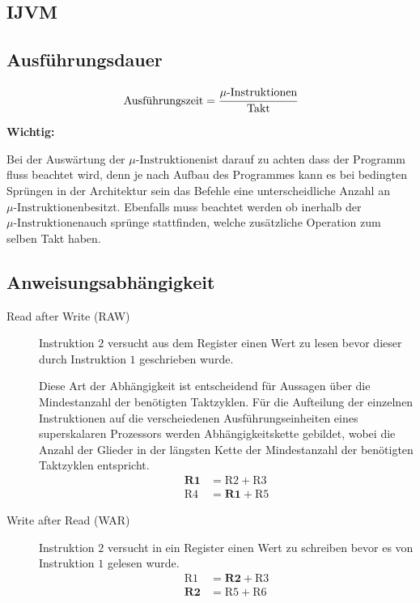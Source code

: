 \documentclass
[
	8pt,		%
	ngerman,	%
	a4paper,	%
	landscape,	%
	final		%
]{extarticle}
\newcommand*\important{\par\vspace{\abovedisplayskip}\textbf{Wichtig:}\par}
\begin{document}
\begin{multicols*}{4}
\newcommand{\microinst}{\ensuremath{\mu\text{-Instruktionen}}}
\section{IJVM}
\subsection{Ausführungsdauer}
\[
	\text{Ausführungszeit} = \cfrac{\microinst}{\text{Takt}}
\]
\important Bei der Auswärtung der \microinst ist darauf zu achten dass der
Programm fluss beachtet wird, denn je nach Aufbau des Programmes kann es bei
bedingten Sprüngen in der Architektur sein das Befehle eine unterscheidliche
Anzahl an \microinst besitzt. Ebenfalls muss beachtet werden ob inerhalb der
\microinst auch sprünge stattfinden, welche zusätzliche Operation zum selben
Takt haben.
\subsection{Anweisungsabhängigkeit}
\begin{description}
	\item[Read after Write (RAW)]
	      Instruktion \(2\) versucht aus dem Register einen Wert zu lesen
	      bevor dieser durch Instruktion \(1\) geschrieben wurde. \par
	      Diese Art der Abhängigkeit ist entscheidend für Aussagen über die
	      Mindestanzahl der benötigten Taktzyklen. Für die Aufteilung der
	      einzelnen Instruktionen auf die verscheiedenen
	      Ausführungseinheiten eines superskalaren Prozessors werden
	      Abhängigkeitskette gebildet, wobei die Anzahl der Glieder in der
	      längsten Kette der Mindestanzahl der benötigten Taktzyklen
	      entspricht.
	      \begin{align}
		      \textbf{R1} & = \text{R2} + \text{R3}   \\
		      \text{R4}   & = \textbf{R1} + \text{R5}
	      \end{align}
	      \setcounter{equation}{0}

	\item[Write after Read (WAR)]
	      Instruktion \(2\) versucht in ein Register einen Wert zu schreiben
	      bevor es von Instruktion \(1\) gelesen wurde.
	      \begin{align}
		      \text{R1}   & = \textbf{R2} + \text{R3} \\
		      \textbf{R2} & = \text{R5} + \text{R6}
	      \end{align}
	      \setcounter{equation}{0}


\end{description}
\end{multicols*}
\end{document}
